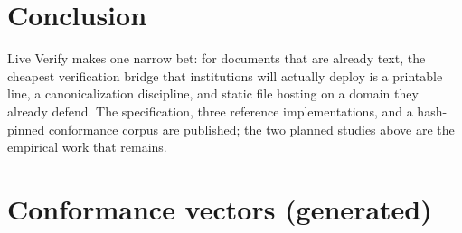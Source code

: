 \documentclass[11pt]{article}
\begin{document}
\section{Conclusion}

Live Verify makes one narrow bet: for documents that are already text, the
cheapest verification bridge that institutions will actually deploy is a
printable line, a canonicalization discipline, and static file hosting on a
domain they already defend. The specification, three reference
implementations, and a hash-pinned conformance corpus are published; the two
planned studies above are the empirical work that remains.




\appendix
\section{Conformance vectors (generated)}\label{app:vectors}

\end{document}
